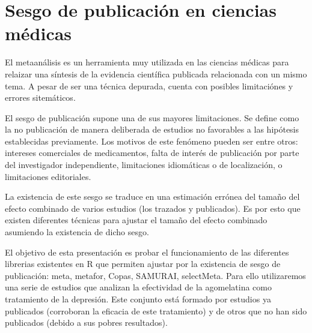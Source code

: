 \chapter{Sesgo de publicación en ciencias médicas}




El metaanálisis es un herramienta muy utilizada en las ciencias médicas para relaizar una síntesis de la evidencia científica publicada relacionada con un mismo tema. A pesar de ser una técnica depurada, cuenta con posibles limitaciónes y errores sitemáticos. 

El sesgo de publicación supone una de sus mayores limitaciones. Se define como la no publicación de manera deliberada de estudios no favorables a las hipótesis establecidas previamente. Los motivos de este fenómeno pueden ser entre otros: intereses comerciales de medicamentos, falta de interés de publicación por parte del investigador independiente, limitaciones idiomáticas o de localización, o limitaciones editoriales.

La existencia de este sesgo se traduce en una estimación errónea del tamaño del efecto combinado de varios estudios (los trazados y publicados). Es por esto que existen diferentes técnicas para ajustar el tamaño del efecto combinado asumiendo la existencia de dicho sesgo. 

El objetivo de esta presentación es probar el funcionamiento de las diferentes librerias existentes en R que permiten ajustar por la existencia de sesgo de publicación: meta, metafor, Copas, SAMURAI, selectMeta. Para ello utilizaremos una serie de estudios que analizan la efectividad de la agomelatina como tratamiento de la depresión. Este conjunto está formado por estudios ya publicados (corroboran la eficacia de este tratamiento) y de otros que no han sido publicados (debido a sus pobres resultados).

